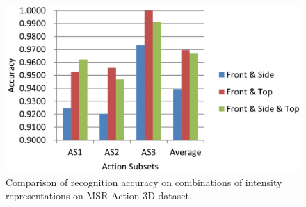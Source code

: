 \documentclass[final,3p,times,twocolumn]{elsarticle}
\begin{document}
\begin{figure}[h]
	\centering
	\includegraphics[width=\columnwidth]{Figures/Chart_RoleOfRepresentations.pdf}
	\caption{Comparison of recognition accuracy on combinations of intensity representations on MSR Action 3D dataset.}
	\label{Figure_CombinationsFRONTSIDETOP}
\end{figure}
\end{document}
